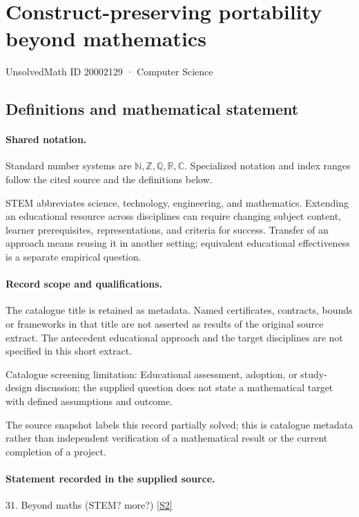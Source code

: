 \documentclass[11pt]{article}
\newcommand{\sref}[2]{\hyperlink{source:#1:#2}{[S#2]}}
\begin{document}
\setcounter{section}{20002128}
\section{Construct-preserving portability beyond mathematics}\label{20002129}
{\small\sffamily UnsolvedMath ID 20002129 · Computer Science}
\subsection{Definitions and mathematical statement}

\paragraph{Shared notation.}Standard number systems are $\mathbb N,\mathbb Z,\mathbb Q,\mathbb R,\mathbb C$. Specialized notation and index ranges follow the cited source and the definitions below.


STEM abbreviates science, technology, engineering, and mathematics. Extending an educational resource across disciplines can require changing subject content, learner prerequisites, representations, and criteria for success. Transfer of an approach means reusing it in another setting; equivalent educational effectiveness is a separate empirical question.
\paragraph{Record scope and qualifications.}
The catalogue title is retained as metadata. Named certificates, contracts, bounds or frameworks in that title are not asserted as results of the original source extract.
The antecedent educational approach and the target disciplines are not specified in this short extract.

Catalogue screening limitation: Educational assessment, adoption, or study-design discussion; the supplied question does not state a mathematical target with defined assumptions and outcome.

The source snapshot labels this record partially solved; this is catalogue metadata rather than independent verification of a mathematical result or the current completion of a project.
\paragraph{Statement recorded in the supplied source.}
31. Beyond maths (STEM? more?) \sref{20002129}{2}
\end{document}
